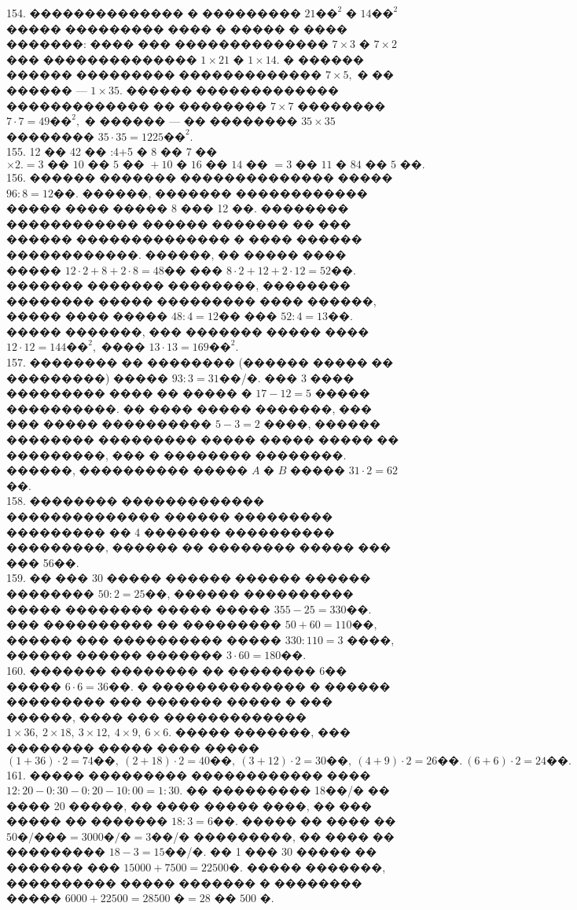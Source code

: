 \documentclass[12pt]{article}
\begin{document}
154. �������������� � ��������� $21\text{��}^2$ � $14\text{��}^2$ ����� ��������� ���� � ����� � ���� �������: ���� ��� �������������� $7\times3$ � $7\times2$ ��� �������������� $1\times21$ � $1\times14.$ � ������ ������ ��������� ������������� $7\times5,$ � �� ������ --- $1\times35.$ ������ ������������� ������������� �� �������� $7\times7$ �������� $7\cdot7=49\text{��}^2,$ � ������ --- �� �������� $35\times35$ �������� $35\cdot35=1225\text{��}^2.$\\
155. 12 �� 42 �� :4+5 � 8 �� 7 ��$\times2.=3\text{ �� }10\text{ �� }5\text{ �� }+10\text{ � }16\text{ �� }14\text{ �� }=3\text{ �� }11\text{ � }84\text{ �� }5\text{ ��.}$\\
156. ������ ������� �������������� ����� $96:8=12$��. ������, ������� ������������ ����� ���� ����� 8 ��� 12 ��. �������� ������������ ������ ������� �� ��� ������ �������������� � ���� ������ ������������. ������, �� ����� ���� ����� $12\cdot2+8+2\cdot8=48$�� ��� $8\cdot2+12+2\cdot12=52$��. ������� ������� ��������, �������� �������� ����� ��������� ���� ������, ����� ���� ����� $48:4=12$�� ��� $52:4=13$��. ����� �������, ��� ������� ����� ���� $12\cdot12=144\text{��}^2,$ ���� $13\cdot13=169\text{��}^2.$\\
157. �������� �� �������� (������ ����� �� ���������) ����� $93:3=31$��/�. ��� 3 ���� ��������� ���� �� ����� � $17-12=5$ ����� ����������. �� ���� ����� �������, ��� ��� ����� ���������� $5-3=2$ ����, ������ �������� ��������� ����� ����� ����� �� ���������, ��� � �������� ��������. ������, ���������� �����  $A$ � $B$ ����� $31\cdot2=62$��.\\
158. �������� ������������� �������������� ������ ��������� ��������� �� 4 ������� ���������� ���������, ������ �� �������� ����� ��� ��� 56��.\\
159. �� ��� 30 ����� ������ ������ ������ �������� $50:2=25$��, ������ ���������� ����� �������� ����� ����� $355-25=330$��. ��� ���������� �� ��������� $50+60=110$��, ������ ��� ���������� ����� $330:110=3$ ����, ������ ������ ������� $3\cdot60=180$��.\\
160. ������� �������� �� �������� 6�� ����� $6\cdot6=36$��. � �������������� � ������ ��������� ��� ������� ����� � ��� ������, ���� ��� ������������� $1\times36,\ 2\times18,\ 3\times12,\ 4\times9,\ 6\times6.$ ����� �������, ��� �������� ����� ���� ����� $(1+36)\cdot2=74\text{��},\ (2+18)\cdot2=40\text{��},\ (3+12)\cdot2=30\text{��},\ (4+9)\cdot2=26\text{��}.\ (6+6)\cdot2=24\text{��}.$\\
161. ����� ��������� ������������ ���� $12:20-0:30-0:20-10:00=1:30.$ �� ��������� 18��/� �� ���� 20 �����, �� ���� ����� ����, �� ��� ����� �� ������� $18:3=6$��. ����� �� ���� �� $50\text{�/���}=3000\text{�/�}=3$��/� ���������, �� ���� �� ��������� $18-3=15$��/�. �� 1 ��� 30 ����� �� ������� ��� $15000+7500=22500$�. ����� �������, ���������� ����� ������� � �������� ����� $6000+22500=28500\text{ �}=28\text{ �� }500\text{ �.}$\\
\end{document}
